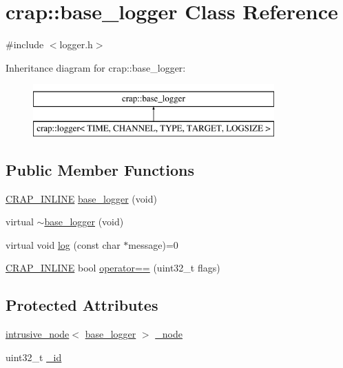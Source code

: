 \hypertarget{classcrap_1_1base__logger}{\section{crap\+:\+:base\+\_\+logger Class Reference}
\label{classcrap_1_1base__logger}
}


{\ttfamily \#include $<$logger.\+h$>$}

Inheritance diagram for crap\+:\+:base\+\_\+logger\+:\begin{figure}[H]
\begin{center}
\leavevmode
\includegraphics[height=2.000000cm]{classcrap_1_1base__logger}
\end{center}
\end{figure}
\subsection*{Public Member Functions}
\begin{DoxyCompactItemize}
\item 
\hyperlink{config__x86_8h_a5a40526b8d842e7ff731509998bb0f1c}{C\+R\+A\+P\+\_\+\+I\+N\+L\+I\+N\+E} \hyperlink{classcrap_1_1base__logger_abd3c6e2087c45aff47a0dad949c285eb}{base\+\_\+logger} (void)
\item 
virtual \hyperlink{classcrap_1_1base__logger_ab73f1c441b19e3737485bd25dddce0cb}{$\sim$base\+\_\+logger} (void)
\item 
virtual void \hyperlink{classcrap_1_1base__logger_a8f6f23827baa21326be073e28c6b02e0}{log} (const char $\ast$message)=0
\item 
\hyperlink{config__x86_8h_a5a40526b8d842e7ff731509998bb0f1c}{C\+R\+A\+P\+\_\+\+I\+N\+L\+I\+N\+E} bool \hyperlink{classcrap_1_1base__logger_aec70fefb4adc6d6d3958f92fd7f292be}{operator==} (uint32\+\_\+t flags)
\end{DoxyCompactItemize}
\subsection*{Protected Attributes}
\begin{DoxyCompactItemize}
\item 
\hyperlink{classcrap_1_1intrusive__node}{intrusive\+\_\+node}$<$ \hyperlink{classcrap_1_1base__logger}{base\+\_\+logger} $>$ \hyperlink{classcrap_1_1base__logger_aa580a45655e76efb8e5c1dbe81ff4ed8}{\+\_\+node}
\item 
uint32\+\_\+t \hyperlink{classcrap_1_1base__logger_ae80fa04c0ba60e7a94586d3cc7634abb}{\+\_\+id}
\end{DoxyCompactItemize}


